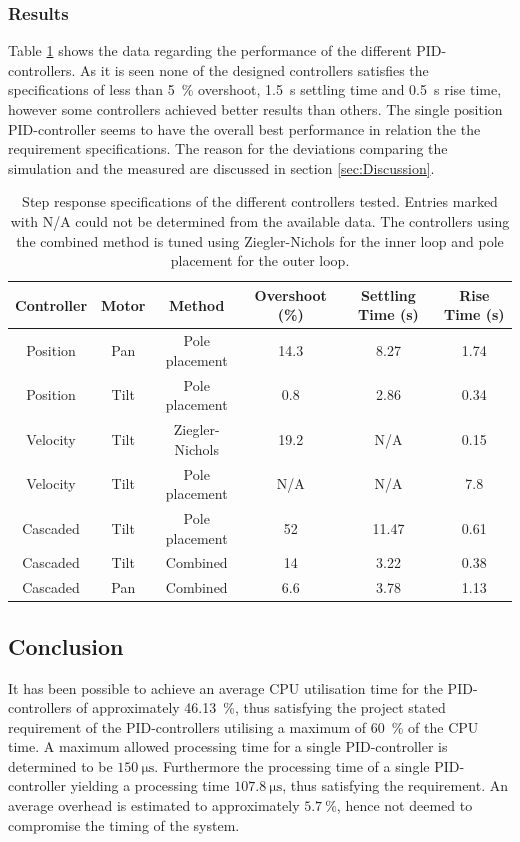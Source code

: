 \documentclass[../../main.tex]{subfiles}
\begin{document}
\subsubsection*{Results}
Table \ref{tab:controller_data} shows the data regarding the performance of the different PID-controllers. As it is seen none of the designed controllers satisfies the specifications of less than \SI{5}{\percent} overshoot, \SI{1,5}{\second} settling time and \SI{0,5}{\second} rise time, however some controllers achieved better results than others. The single position PID-controller seems to have the overall best performance in relation the the requirement specifications. The reason for the deviations comparing the simulation and the measured are discussed in section \ref{sec:Discussion}.
\begin{table}[H]
    \centering
    \begin{tabular}{c|c|c|c|c|c}
         Controller & Motor & Method & Overshoot (\%) & Settling Time (s)  & Rise Time (s) \\ \hline
         Position & Pan & Pole placement & 14.3 & 8.27 & 1.74  \\
         Position & Tilt & Pole placement & 0.8 & 2.86 & 0.34  \\
         Velocity & Tilt & Ziegler-Nichols & 19.2 & N/A & 0.15  \\
         Velocity &Tilt & Pole placement & N/A & N/A & 7.8 \\
         Cascaded & Tilt  & Pole placement & 52 & 11.47 & 0.61 \\
         Cascaded & Tilt & Combined & 14 & 3.22 & 0.38  \\
         Cascaded & Pan & Combined & 6.6 & 3.78 & 1.13  \\
         
    \end{tabular}
    \caption{Step response specifications of the different controllers tested. Entries marked with N/A could not be determined from the available data. The controllers using the combined method is tuned using Ziegler-Nichols for the inner loop and pole placement for the outer loop.}
    \label{tab:controller_data}
\end{table}

\subsection{Conclusion}
It has been possible to achieve an average CPU utilisation time for the PID-controllers of approximately \SI{46,13}{\percent}, thus satisfying the project stated requirement of the PID-controllers utilising a maximum of \SI{60}{\percent} of the CPU time. A maximum allowed processing time for a single PID-controller is determined to be $\SI{150}{\micro \second}$. Furthermore the processing time of a single PID-controller yielding a processing time $\SI{107,8}{\micro \second}$, thus satisfying the requirement. An average overhead is estimated to approximately $\SI{5,7}{\percent}$, hence not deemed to compromise the timing of the system.
\end{document}
